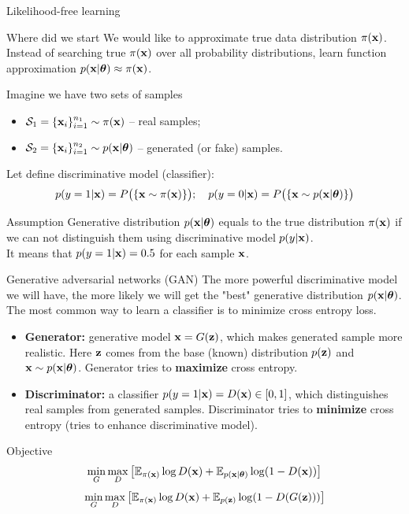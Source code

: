 \begin{frame}{Likelihood-free learning}
	\begin{block}{Where did we start}
	 We would like to approximate true data distribution $\pi(\mathbf{x})$.
	Instead of searching true $\pi(\mathbf{x})$ over all probability distributions, learn function approximation $p(\mathbf{x} | \boldsymbol{\theta}) \approx \pi(\mathbf{x})$.
	\end{block}
	Imagine we have two sets of samples 
	\begin{itemize}
		\item $\mathcal{S}_1 = \{\mathbf{x}_i\}_{i=1}^{n_1} \sim \pi(\mathbf{x})$ -- real samples;
		\item $\mathcal{S}_2 = \{\mathbf{x}_i\}_{i=1}^{n_2} \sim p(\mathbf{x} | \boldsymbol{\theta})$ -- generated (or fake) samples.
	\end{itemize}
	Let define discriminative model (classifier):
	\[
		p(y = 1 | \mathbf{x}) = P\bigl(\{\mathbf{x} \sim \pi(\mathbf{x})\}\bigr); \quad p(y = 0 | \mathbf{x}) = P\bigl(\{\mathbf{x} \sim p(\mathbf{x} | \boldsymbol{\theta})\}\bigr)
	\]
	\vspace{-0.5cm}
	\begin{block}{Assumption}
		Generative distribution $p(\mathbf{x} | \boldsymbol{\theta})$ equals to the true distribution $\pi(\mathbf{x})$ if we can not distinguish them using discriminative model $p(y | \mathbf{x})$. \\
		It means that $p(y = 1 | \mathbf{x}) = 0.5$ for each sample $\mathbf{x}$.
	\end{block}

\end{frame}
\begin{frame}{Generative adversarial networks (GAN)}
	The more powerful discriminative model we will have, the more likely we will get the "best" generative distribution $p(\mathbf{x} | \boldsymbol{\theta})$. \\
	The most common way to learn a classifier is to minimize cross entropy loss.
	\begin{itemize}
		\item \textbf{Generator:} generative model $\mathbf{x} = G(\mathbf{z})$, which makes generated sample more realistic. Here $\mathbf{z}$ comes from the base (known) distribution $p(\mathbf{z})$ and $\mathbf{x} \sim p(\mathbf{x} | \boldsymbol{\theta})$. Generator tries to \textbf{maximize} cross entropy.
		\item \textbf{Discriminator:} a classifier $p(y = 1 | \mathbf{x}) = D(\mathbf{x}) \in [0, 1]$, which distinguishes real samples from generated samples. Discriminator tries to \textbf{minimize} cross entropy (tries to enhance discriminative model).
	\end{itemize}
	\begin{block}{Objective}
		\vspace{-0.5cm}
		\[
			\min_{G} \max_D \left[ \mathbb{E}_{\pi(\mathbf{x})} \log D(\mathbf{x}) + \mathbb{E}_{p(\mathbf{x} | \boldsymbol{\theta})} \log (1 - D(\mathbf{x})) \right] 
		\]
		\[
			\min_{G} \max_D \left[ \mathbb{E}_{\pi(\mathbf{x})} \log D(\mathbf{x}) + \mathbb{E}_{p(\mathbf{z})} \log (1 - D(G(\mathbf{z}))) \right]
		\]
	\end{block}
\end{frame}
